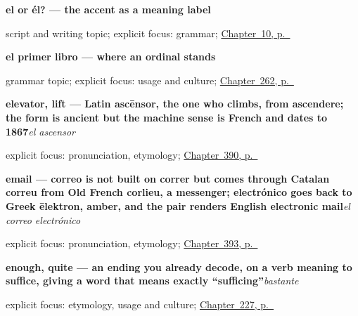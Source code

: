 \noindent\begin{minipage}[t]{\linewidth}
\raggedright
\textbf{el or él? — the accent as a meaning label}\par
\footnotesize script and writing topic; explicit focus: grammar; \hyperref[ch:written-accent]{Chapter~10, p.~\pageref*{ch:written-accent}}
\end{minipage}\par\smallskip

\noindent\begin{minipage}[t]{\linewidth}
\raggedright
\textbf{el primer libro — where an ordinal stands}\par
\footnotesize grammar topic; explicit focus: usage and culture; \hyperref[ch:primero]{Chapter~262, p.~\pageref*{ch:primero}}
\end{minipage}\par\smallskip

\noindent\begin{minipage}[t]{\linewidth}
\raggedright
\textbf{elevator, lift — Latin ascēnsor, the one who climbs, from ascendere; the form is ancient but the machine sense is French and dates to 1867}\enspace\emph{el ascensor}\par
\footnotesize explicit focus: pronunciation, etymology; \hyperref[ch:la-terraza-y-la-sala]{Chapter~390, p.~\pageref*{ch:la-terraza-y-la-sala}}
\end{minipage}\par\smallskip

\noindent\begin{minipage}[t]{\linewidth}
\raggedright
\textbf{email — correo is not built on correr but comes through Catalan correu from Old French corlieu, a messenger; electrónico goes back to Greek ēlektron, amber, and the pair renders English electronic mail}\enspace\emph{el correo electrónico}\par
\footnotesize explicit focus: pronunciation, etymology; \hyperref[ch:el-ordenador-y-el-correo-electronico]{Chapter~393, p.~\pageref*{ch:el-ordenador-y-el-correo-electronico}}
\end{minipage}\par\smallskip

\noindent\begin{minipage}[t]{\linewidth}
\raggedright
\textbf{enough, quite — an ending you already decode, on a verb meaning to suffice, giving a word that means exactly \textquotedblleft{}sufficing\textquotedblright{}}\enspace\emph{bastante}\par
\footnotesize explicit focus: etymology, usage and culture; \hyperref[ch:bastante]{Chapter~227, p.~\pageref*{ch:bastante}}
\end{minipage}\par\smallskip

